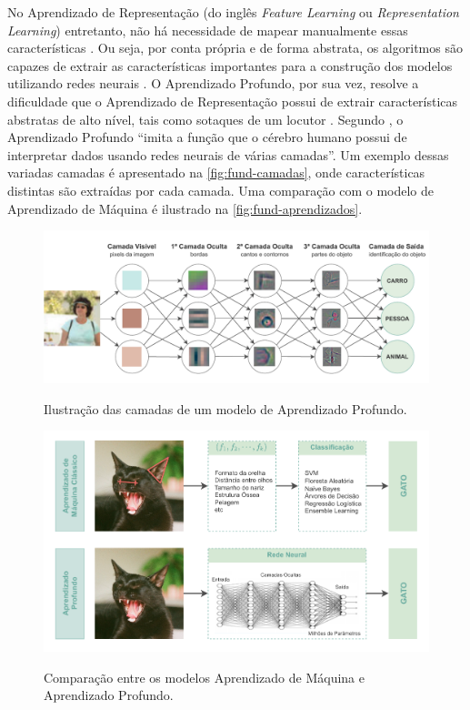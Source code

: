 No Aprendizado de Representação (do inglês \textit{Feature Learning} ou \textit{Representation Learning}) entretanto, não há necessidade de mapear manualmente essas características \cite{ref:Goodfellow-Bengio-Courville}. Ou seja, por conta própria e de forma abstrata, os algoritmos são capazes de extrair as características importantes para a construção dos modelos utilizando redes neurais \cite{ref:Robins} \cite{ref:Lesort}. O Aprendizado Profundo, por sua vez, resolve a dificuldade que o Aprendizado de Representação possui de extrair características abstratas de alto nível, tais como sotaques de um locutor \cite{ref:Goodfellow-Bengio-Courville}. Segundo , o Aprendizado Profundo ``imita a função que o cérebro humano possui de interpretar dados usando redes neurais de várias camadas''. Um exemplo dessas variadas camadas é apresentado na \autoref{fig:fund-camadas}, onde características distintas são extraídas por cada camada. Uma comparação com o modelo de Aprendizado de Máquina é ilustrado na \autoref{fig:fund-aprendizados}.

\begin{figure}[h!] %
  \centering
  \caption{Ilustração das camadas de um modelo de Aprendizado Profundo.}
  \includegraphics[scale=0.8]{img/img-fundamentacao-deep-learning.pdf}
  \label{fig:fund-camadas}
\end{figure}

\begin{figure}[h!] %
  \centering
  \caption{Comparação entre os modelos Aprendizado de Máquina e Aprendizado Profundo.}
  \includegraphics[scale=0.95]{img/img-fundamentacao-aprendizados.pdf}
  \label{fig:fund-aprendizados}
\end{figure}

